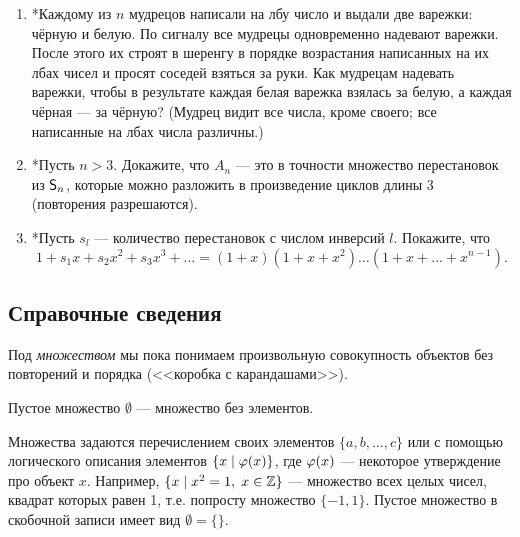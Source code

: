 \begin{enumerate}
\item *Каждому из $n$ мудрецов написали на лбу число и выдали две варежки: чёрную и белую. По сигналу
 все мудрецы одновременно надевают варежки. После этого их строят в шеренгу в порядке возрастания
написанных на их лбах чисел и просят соседей взяться за руки. Как мудрецам надевать варежки, чтобы
в результате каждая белая варежка взялась за белую, а каждая чёрная --- за чёрную? (Мудрец видит все
числа, кроме своего; все написанные на лбах числа различны.)

\item *Пусть $n > 3$. Докажите, что $A_n$ --- это в точности множество перестановок из ${\mathsf{S}}_n$,
которые можно разложить в произведение циклов длины 3 (повторения разрешаются).

\item *Пусть $s_l$ --- количество перестановок с числом инверсий $l$. Покажите, что
$$
1 + s_1 x + s_2 x^2 + s_3x^3 + \dots = (1 + x)(1 + x + x^2 ) \dots (1 + x + . . . + x^{n-1} ).
$$

\end{enumerate}

\subsection*{Справочные сведения}

Под \textit{множеством} мы пока понимаем произвольную совокупность объектов без повторений и порядка (<<коробка с карандашами>>).

Пустое множество $\emptyset$ --- множество без элементов.

Множества задаются перечислением своих элементов $\{a,b,\dots,c\}$ или с помощью логического описания элементов $\{x\mid \varphi(x)\}$, где $\varphi(x)$ --- некоторое утверждение про объект $x$. Например, $\{x\mid x^2=1, \; x\in\mathbb Z\}$ --- множество всех целых чисел, квадрат которых равен 1, т.е. попросту множество $\{-1,1\}$. Пустое множество в скобочной записи имеет вид $\emptyset=\{\}$.

